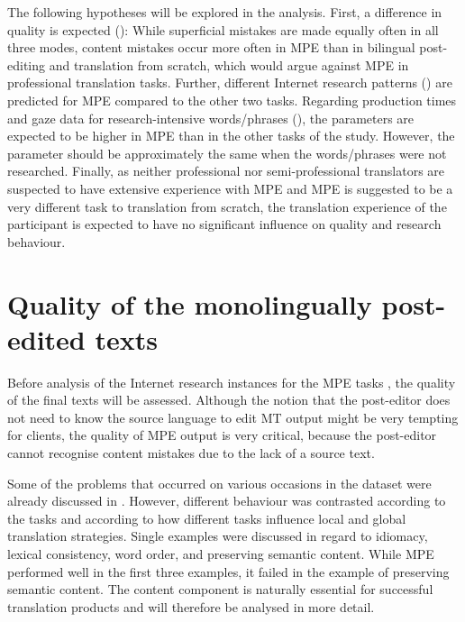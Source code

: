 \documentclass[output=paper]{langsci/langscibook}
\begin{document}
The following hypotheses will be explored in the analysis. First, a difference in quality is expected (): While superficial mistakes are made equally often in all three modes, content mistakes occur more often in MPE than in bilingual post-editing and translation from scratch, which would argue against MPE in professional translation tasks. Further, different Internet research patterns () are predicted for MPE compared to the other two tasks. Regarding production times and gaze data for research-intensive words/phrases (), the parameters are expected to be higher in MPE than in the other tasks of the study. However, the parameter should be approximately the same when the words/phrases were not researched. Finally, as neither professional nor semi-professional translators are suspected to have extensive experience with MPE and MPE is suggested to be a very different task to translation from scratch, the translation experience of the participant is expected to have no significant influence on quality and research behaviour.


\section{Quality of the monolingually post-edited texts\label{nitzke:sec:QualityOfTheMonolingual}}

\largerpage
Before analysis of the Internet research instances for the MPE tasks , the quality of the final texts will be assessed. Although the notion that the post-editor does not need to know the source language to edit MT output might be very tempting for clients, the quality of MPE output is very critical, because the post-editor cannot recognise content mistakes due to the lack of a source text.


Some of the problems that occurred on various occasions in the dataset were already discussed in \citet{Culo2014}. However, different behaviour was contrasted according to the tasks and according to how different tasks influence local and global translation strategies. Single examples were discussed in regard to idiomacy, lexical consistency, word order, and preserving semantic content. While MPE performed well in the first three examples, it failed in the example of preserving semantic content. The content component is naturally essential for successful translation products and will therefore be analysed in more detail.
\end{document}
